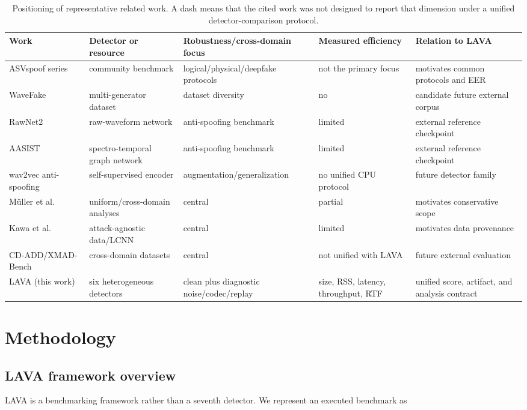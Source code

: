 \documentclass[10pt,journal,onecolumn]{IEEEtran}
\begin{document}
\begin{table}[htbp]
\centering
\small
\caption{Positioning of representative related work. A dash means that the cited work was not designed to report that dimension under a unified detector-comparison protocol.}
\label{tab:1}
\begin{tabularx}{\textwidth}{YYYYY}
\toprule
Work & Detector or resource & Robustness/cross-domain focus & Measured efficiency & Relation to LAVA \\
\midrule
ASVspoof series \cite{wu2015asvspoof,kinnunen2017asvspoof,todisco2019asvspoof,yamagishi2021asvspoof,kinnunen2018tdcf} & community benchmark & logical/physical/deepfake protocols & not the primary focus & motivates common protocols and EER \\
WaveFake \cite{frank2021wavefake} & multi-generator dataset & dataset diversity & no & candidate future external corpus \\
RawNet2 \cite{tak2021rawnet2} & raw-waveform network & anti-spoofing benchmark & limited & external reference checkpoint \\
AASIST \cite{jung2022aasist} & spectro-temporal graph network & anti-spoofing benchmark & limited & external reference checkpoint \\
wav2vec anti-spoofing \cite{tak2022wav2vec} & self-supervised encoder & augmentation/generalization & no unified CPU protocol & future detector family \\
M\"uller et al. \cite{muller2022generalize,muller2024harder} & uniform/cross-domain analyses & central & partial & motivates conservative scope \\
Kawa et al. \cite{kawa2022attack} & attack-agnostic data/LCNN & central & limited & motivates data provenance \\
CD-ADD/XMAD-Bench \cite{li2024crossdomain,ciobanu2026xmad} & cross-domain datasets & central & not unified with LAVA & future external evaluation \\
LAVA (this work) & six heterogeneous detectors & clean plus diagnostic noise/codec/replay & size, RSS, latency, throughput, RTF & unified score, artifact, and analysis contract \\
\bottomrule
\end{tabularx}
\end{table}
\section{Methodology}
\subsection{LAVA framework overview}
LAVA is a benchmarking framework rather than a seventh detector. We represent an executed benchmark as
\end{document}
